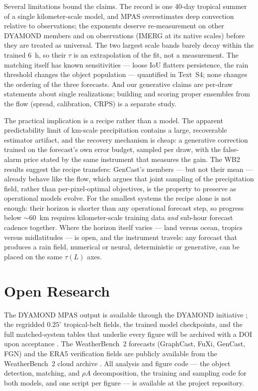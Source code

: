 \documentclass[draft]{agujournal2019}
\begin{document}
Several limitations bound the claims. The record is one 40-day tropical
summer of a single kilometer-scale model, and MPAS overestimates deep
convection relative to observations; the exponents deserve re-measurement on
other DYAMOND members and on observations (IMERG at its native scales) before
they are treated as universal. The two largest scale bands barely decay
within the trained $6$~h, so their $\tau$ is an extrapolation of the fit,
not a measurement. The matching itself has known sensitivities --- loose IoU
flatters persistence, the rain threshold changes the object population ---
quantified in Text~S4; none changes the ordering of the three forecasts. And
our generative claims are per-draw statements about single realizations;
building and scoring proper ensembles from the flow (spread, calibration,
CRPS) is a separate study.

The practical implication is a recipe rather than a model. The apparent
predictability limit of km-scale precipitation contains a large,
recoverable estimator artifact, and the recovery mechanism is cheap: a
generative correction trained on the forecast's own error budget, sampled
per draw, with the false-alarm price stated by the same instrument that
measures the gain. The WB2 results suggest the recipe transfers: GenCast's
members --- but not their mean --- already behave like the flow, which
argues that joint sampling of the precipitation field, rather than
per-pixel-optimal objectives, is the property to preserve as operational
models evolve. For the smallest systems the recipe alone is not enough:
their horizon is shorter than any operational forecast step, so progress
below ${\sim}60$~km requires kilometer-scale training data \emph{and}
sub-hour forecast cadence together. Where the horizon itself varies --- land
versus ocean, tropics versus midlatitudes --- is open, and the instrument
travels: any forecast that produces a rain field, numerical or neural,
deterministic or generative, can be placed on the same $\tau(L)$ axes.

\section{Open Research}
The DYAMOND MPAS output is available through the DYAMOND initiative
\cite{stevens2019}; the regridded $0.25^{\circ}$ tropical-belt fields, the
trained model checkpoints, and the full matched-system tables that underlie
every figure will be archived with a DOI upon acceptance
. The WeatherBench~2 forecasts (GraphCast, FuXi, GenCast, FGN) and the ERA5
verification fields are publicly available from the WeatherBench~2 cloud
archive \cite{rasp2024}. All analysis and figure code --- the object
detection, matching, and $\rho A$ decomposition, the training and sampling
code for both models, and one script per figure --- is available at
the project repository.
\end{document}
